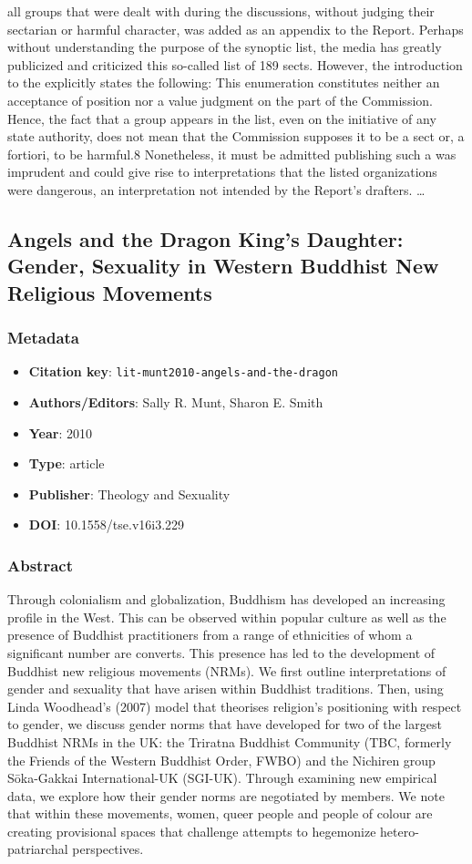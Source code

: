all groups that were dealt with during the discussions, without judging their sectarian or harmful character, was added as an appendix to the Report. Perhaps without understanding the purpose of the synoptic list, the media has greatly publicized and criticized this so-called list of 189 sects. However, the introduction to the explicitly states the following: This enumeration constitutes neither an acceptance of position nor a value judgment on the part of the Commission. Hence, the fact that a group appears in the list, even on the initiative of any state authority, does not mean that the Commission supposes it to be a sect or, a fortiori, to be harmful.8 Nonetheless, it must be admitted publishing such a was imprudent and could give rise to interpretations that the listed organizations were dangerous, an interpretation not intended by the Report's drafters. …

\subsection{Angels and the Dragon King's Daughter: Gender, Sexuality in Western Buddhist New Religious Movements}\label{lit:lit-munt2010-angels-and-the-dragon}
\subsubsection*{Metadata}
\begin{itemize}
  \item \textbf{Citation key}: \texttt{lit-munt2010-angels-and-the-dragon}
  \item \textbf{Authors/Editors}: Sally R. Munt, Sharon E. Smith
  \item \textbf{Year}: 2010
  \item \textbf{Type}: article
  \item \textbf{Publisher}: Theology and Sexuality
  \item \textbf{DOI}: 10.1558/tse.v16i3.229
\end{itemize}
\subsubsection*{Abstract}
Through colonialism and globalization, Buddhism has developed an increasing profile in the West. This can be observed within popular culture as well as the presence of Buddhist practitioners from a range of ethnicities of whom a significant number are converts. This presence has led to the development of Buddhist new religious movements (NRMs). We first outline interpretations of gender and sexuality that have arisen within Buddhist traditions. Then, using Linda Woodhead's (2007) model that theorises religion's positioning with respect to gender, we discuss gender norms that have developed for two of the largest Buddhist NRMs in the UK: the Triratna Buddhist Community (TBC, formerly the Friends of the Western Buddhist Order, FWBO) and the Nichiren group Sōka-Gakkai International-UK (SGI-UK). Through examining new empirical data, we explore how their gender norms are negotiated by members. We note that within these movements, women, queer people and people of colour are creating provisional spaces that challenge attempts to hegemonize hetero-patriarchal perspectives.

